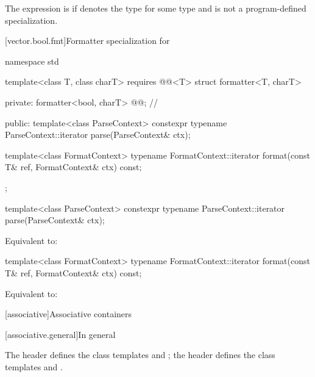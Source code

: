 \begin{itemdescr}
\pnum
The expression
 is 
if  denotes the type 
for some type  and
 is not a program-defined specialization.
\end{itemdescr}

[vector.bool.fmt]{Formatter specialization for }

%
\begin{codeblock}
namespace std {
  template<class T, class charT>
    requires @@<T>
  struct formatter<T, charT> {
  private:
    formatter<bool, charT> @@;       // \expos

  public:
    template<class ParseContext>
      constexpr typename ParseContext::iterator
        parse(ParseContext& ctx);

    template<class FormatContext>
      typename FormatContext::iterator
        format(const T& ref, FormatContext& ctx) const;
  };
}
\end{codeblock}

%
\begin{itemdecl}
template<class ParseContext>
  constexpr typename ParseContext::iterator
    parse(ParseContext& ctx);
\end{itemdecl}

\begin{itemdescr}
\pnum
Equivalent to: 
\end{itemdescr}

%
\begin{itemdecl}
template<class FormatContext>
  typename FormatContext::iterator
    format(const T& ref, FormatContext& ctx) const;
\end{itemdecl}

\begin{itemdescr}
\pnum
Equivalent to: 
\end{itemdescr}

[associative]{Associative containers}

[associative.general]{In general}

\pnum
The header  defines the class templates  and
; the header  defines the class templates
 and .

